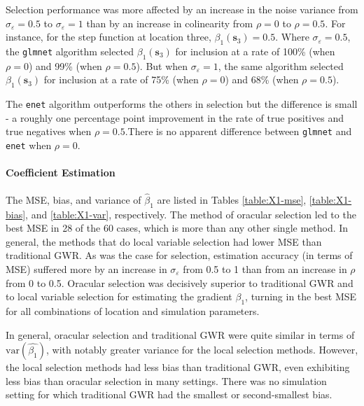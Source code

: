 \documentclass[authoryear, review, 11pt]{elsarticle}
\begin{document}
	Selection performance was more affected by an increase in the noise variance from $\sigma_{\varepsilon}=0.5$ to $\sigma_{\varepsilon}=1$ than by an increase in colinearity from $\rho = 0$ to $\rho = 0.5$. For instance, for the step function at location three, $\beta_1(\bm{s}_3) = 0.5$. Where $\sigma_{\varepsilon}=0.5$, the {\tt glmnet} algorithm selected $\beta_1(\bm{s}_3) $ for inclusion at a rate of 100\% (when $\rho = 0$) and 99\% (when $\rho = 0.5$). But when $\sigma_{\varepsilon}=1$, the same algorithm selected $\beta_1(\bm{s}_3)$ for inclusion at a rate of 75\% (when $\rho = 0$) and 68\% (when $\rho = 0.5$).
	
	The \verb!enet! algorithm outperforms the others in selection but the difference is small - a roughly one percentage point improvement in the rate of true positives and true negatives when $\rho = 0.5$.There is no apparent difference between {\tt glmnet} and {\tt enet} when $\rho = 0$.  
	
	
	\paragraph{Coefficient Estimation} The MSE, bias, and variance of $\hat{\beta}_1$ are listed in Tables \ref{table:X1-mse}, \ref{table:X1-bias}, and \ref{table:X1-var}, respectively. The method of oracular selection led to the best MSE in 28 of the 60 cases, which is more than any other single method. In general, the methods that do local variable selection had lower MSE than traditional GWR. As was the case for selection, estimation accuracy (in terms of MSE) suffered more by an increase in $\sigma_{\varepsilon}$ from 0.5 to 1 than from an increase in $\rho$ from 0 to 0.5. Oracular selection was decisively superior to traditional GWR and to local variable selection for estimating the gradient $\beta_1$, turning in the best MSE for all combinations of location and simulation parameters.
	
	In general, oracular selection and traditional GWR were quite similar in terms of $\text{var}\left(\hat{\beta_1}\right)$, with notably greater variance for the local selection methods. However, the local selection methods had less bias than traditional GWR, even exhibiting less bias than oracular selection in many settings. There was no simulation setting for which traditional GWR had the smallest or second-smallest bias.
	
\end{document}
